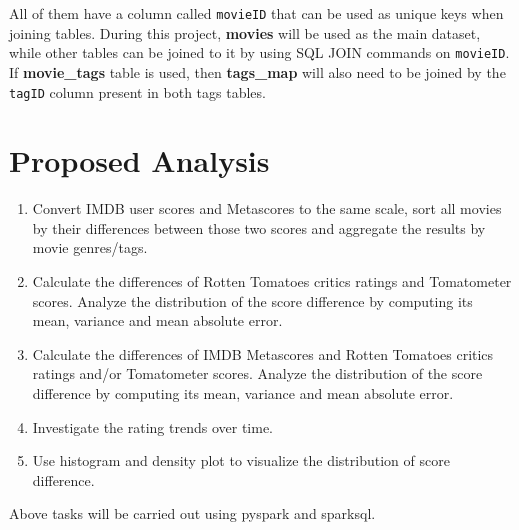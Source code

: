 \documentclass[11pt]{article}
\begin{document}
All of them have a column called {\tt movieID} that can be used as unique keys when joining tables. During this project, {\bf movies} will be used as the main dataset, while other tables can be joined to it by using SQL JOIN commands on {\tt movieID}. If {\bf movie\_tags} table is used, then {\bf tags\_map} will also need to be joined by the {\tt tagID} column present in both tags tables. 

\section*{Proposed Analysis}

\begin{enumerate}[label = \alph*)]
	\item Convert IMDB user scores and Metascores to the same scale, sort all movies by their differences between those two scores and aggregate the results by movie genres/tags. 
	\item Calculate the differences of Rotten Tomatoes critics ratings and Tomatometer scores. Analyze the distribution of the score difference by computing its mean, variance and mean absolute error. 
	\item Calculate the differences of IMDB Metascores and Rotten Tomatoes critics ratings and/or Tomatometer scores. Analyze the distribution of the score difference by computing its mean, variance and mean absolute error.
	\item Investigate the rating trends over time. 
	\item Use histogram and density plot to visualize the distribution of score difference. 
\end{enumerate}

Above tasks will be carried out using pyspark and sparksql. 
\end{document}
